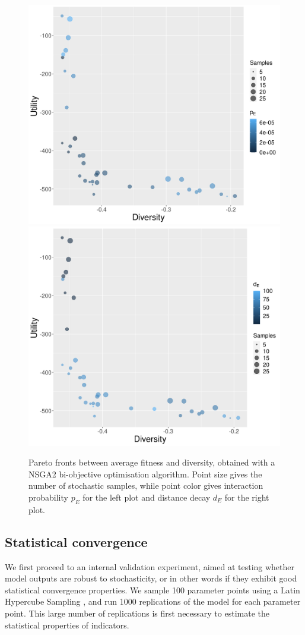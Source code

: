 \documentclass[letterpaper]{article}
\begin{document}
\begin{figure}[h!]
\begin{center}
\includegraphics[width=0.48\linewidth]{paretoDiversity-Fitness_colorinteractionProba.png}
\includegraphics[width=0.48\linewidth]{paretoDiversity-Fitness_colordistanceDecay.png}
\caption{Pareto fronts between average fitness and diversity, obtained with a NSGA2 bi-objective optimisation algorithm. Point size gives the number of stochastic samples, while point color gives interaction probability $p_E$ for the left plot and distance decay $d_E$ for the right plot.}
\label{fig:fig2}
\end{center}
\end{figure}


\subsection{Statistical convergence}

We first proceed to an internal validation experiment, aimed at testing whether model outputs are robust to stochasticity, or in other words if they exhibit good statistical convergence properties. We sample 100 parameter points using a Latin Hypercube Sampling \citep{giunta2003overview}, and run 1000 replications of the model for each parameter point. This large number of replications is first necessary to estimate the statistical properties of indicators.
\end{document}

